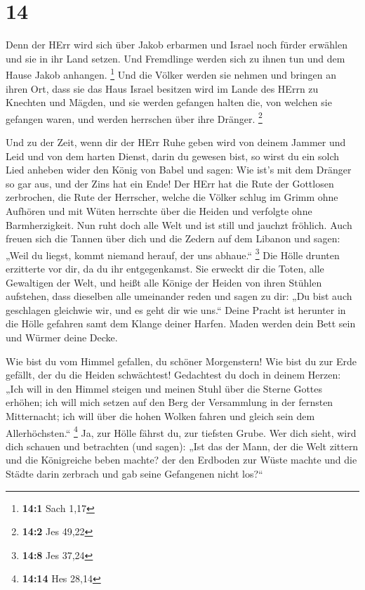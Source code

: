 \hypertarget{section-7}{%
\section{14}\label{section-7}}

 Denn der HErr wird sich über Jakob erbarmen und Israel noch
fürder erwählen und sie in ihr Land setzen. Und Fremdlinge werden sich
zu ihnen tun und dem Hause Jakob anhangen. \footnote{\textbf{14:1} Sach
  1,17}  Und die Völker werden sie nehmen und bringen an
ihren Ort, dass sie das Haus Israel besitzen wird im Lande des HErrn zu
Knechten und Mägden, und sie werden gefangen halten die, von welchen sie
gefangen waren, und werden herrschen über ihre Dränger. \footnote{\textbf{14:2}
  Jes 49,22}

 Und zu der Zeit, wenn dir der HErr Ruhe geben wird von
deinem Jammer und Leid und von dem harten Dienst, darin du gewesen bist,
 so wirst du ein solch Lied anheben wider den König von
Babel und sagen: Wie ist's mit dem Dränger so gar aus, und der Zins hat
ein Ende!  Der HErr hat die Rute der Gottlosen zerbrochen,
die Rute der Herrscher,  welche die Völker schlug im Grimm
ohne Aufhören und mit Wüten herrschte über die Heiden und verfolgte ohne
Barmherzigkeit.  Nun ruht doch alle Welt und ist still und
jauchzt fröhlich.  Auch freuen sich die Tannen über dich und
die Zedern auf dem Libanon und sagen: „Weil du liegst, kommt niemand
herauf, der uns abhaue.`` \footnote{\textbf{14:8} Jes 37,24}
 Die Hölle drunten erzitterte vor dir, da du ihr
entgegenkamst. Sie erweckt dir die Toten, alle Gewaltigen der Welt, und
heißt alle Könige der Heiden von ihren Stühlen aufstehen, 
dass dieselben alle umeinander reden und sagen zu dir: „Du bist auch
geschlagen gleichwie wir, und es geht dir wie uns.``  Deine
Pracht ist herunter in die Hölle gefahren samt dem Klange deiner Harfen.
Maden werden dein Bett sein und Würmer deine Decke.

 Wie bist du vom Himmel gefallen, du schöner Morgenstern!
Wie bist du zur Erde gefällt, der du die Heiden schwächtest!
 Gedachtest du doch in deinem Herzen: „Ich will in den
Himmel steigen und meinen Stuhl über die Sterne Gottes erhöhen;
 ich will mich setzen auf den Berg der Versammlung in der
fernsten Mitternacht; ich will über die hohen Wolken fahren und gleich
sein dem Allerhöchsten.`` \footnote{\textbf{14:14} Hes 28,14}
 Ja, zur Hölle fährst du, zur tiefsten Grube. 
Wer dich sieht, wird dich schauen und betrachten (und sagen): „Ist das
der Mann, der die Welt zittern und die Königreiche beben machte?
 der den Erdboden zur Wüste machte und die Städte darin
zerbrach und gab seine Gefangenen nicht los?{}``

